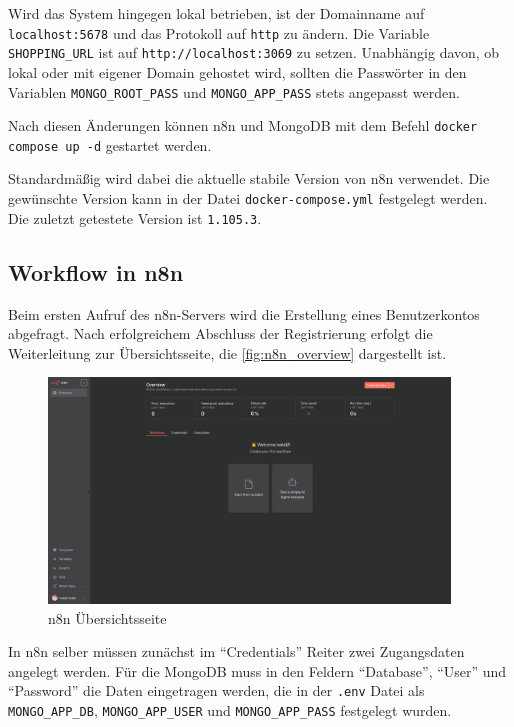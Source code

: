 Wird das System hingegen lokal betrieben, ist der Domainname auf \verb|localhost:5678| und das
Protokoll auf \verb|http| zu ändern. Die Variable \verb|SHOPPING_URL| ist auf
\verb|http://localhost:3069| zu setzen. Unabhängig davon, ob lokal oder mit eigener Domain gehostet
wird, sollten die Passwörter in den Variablen \verb|MONGO_ROOT_PASS| und \verb|MONGO_APP_PASS| stets
angepasst werden.

Nach diesen Änderungen können n8n und MongoDB mit dem Befehl \verb|docker compose up -d| gestartet
werden.

Standardmäßig wird dabei die aktuelle stabile Version von n8n verwendet. Die gewünschte Version kann
in der Datei \verb|docker-compose.yml| festgelegt werden. Die zuletzt getestete Version ist
\verb|1.105.3|.

\subsection{Workflow in n8n}\label{sub:workflow_in_n_n} %
Beim ersten Aufruf des n8n-Servers wird die Erstellung eines Benutzerkontos abgefragt. Nach
erfolgreichem Abschluss der Registrierung erfolgt die Weiterleitung zur Übersichtsseite, die
\autoref{fig:n8n_overview} dargestellt ist.

\begin{figure}
    \begin{center}
        \includegraphics[width=0.95\textwidth]{images/n8n_overview.png}
    \end{center}
    \caption{n8n Übersichtsseite}\label{fig:n8n_overview}
\end{figure}

In n8n selber müssen zunächst im \enquote{Credentials} Reiter zwei Zugangsdaten angelegt werden. Für
die MongoDB muss in den Feldern \enquote{Database}, \enquote{User} und \enquote{Password} die Daten
eingetragen werden, die in der \verb|.env| Datei als \verb|MONGO_APP_DB|, \verb|MONGO_APP_USER| und
\verb|MONGO_APP_PASS| festgelegt wurden.

